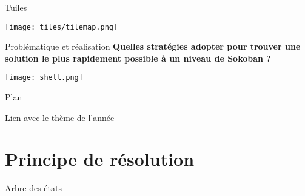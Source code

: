        \begin{frame}{Tuiles}
            \centering

            \texttt{[image: tiles/tilemap.png]}

        \end{frame}

        \begin{frame}{Problématique et réalisation}
            \centering
            \Large\textbf{Quelles stratégies adopter pour trouver une solution le plus rapidement possible à un niveau de Sokoban ?}

            \vspace{1.5cm} %
            \texttt{[image: shell.png]}
         \end{frame}

        \begin{frame}{Plan}
            \tableofcontents%
        \end{frame}

        \begin{frame}{Lien avec le thème de l'année}
            \centering
        \end{frame}

    \section{Principe de résolution}
        \begin{frame}{Arbre des états}
            
        \end{frame}

